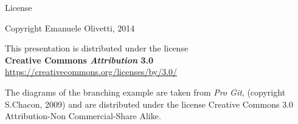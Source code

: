 \documentclass{beamer}
\begin{document}
\begin{frame}{License}
  \begin{center}
    Copyright Emanuele Olivetti, 2014
  \end{center}
  \vspace{1em}
  \begin{center}
    This presentation is distributed under the license\\
    \textbf{Creative Commons \emph{Attribution} 3.0}\\
    \url{https://creativecommons.org/licenses/by/3.0/}
  \end{center}
  \vspace{1em}
  \begin{center}\small
    The diagrams of the branching example are taken from \emph{Pro
      Git}, (copyright S.Chacon, 2009) and are distributed under the
    license Creative Commons 3.0 Attribution-Non Commercial-Share
    Alike.
  \end{center}
\end{frame}
\end{document}
